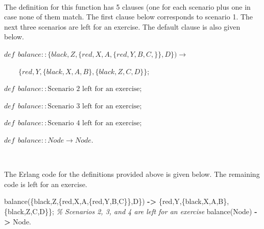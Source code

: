 \documentclass[
]{book}
\newenvironment{Shaded}{\begin{snugshade}}{\end{snugshade}}
\newcommand{\CharTok}[1]{\textcolor[rgb]{0.31,0.60,0.02}{#1}}
\newcommand{\CommentTok}[1]{\textcolor[rgb]{0.56,0.35,0.01}{\textit{#1}}}
\newcommand{\FunctionTok}[1]{\textcolor[rgb]{0.00,0.00,0.00}{#1}}
\newcommand{\OperatorTok}[1]{\textcolor[rgb]{0.81,0.36,0.00}{\textbf{#1}}}
\newcommand{\VariableTok}[1]{\textcolor[rgb]{0.00,0.00,0.00}{#1}}
\begin{document}
\(\nonumber\)

The definition for this function has 5 clauses (one for each scenario plus one in case none of them match. The first clause below corresponds to scenario 1. The next three scenarios are left for an exercise. The default clause is also given below.

\begin{formulabox}
\(\mathit{def} ~ ~ balance :: \lbrace black, Z, \lbrace red, X, A, \lbrace red, Y, B, C, \rbrace \rbrace, D \rbrace) \rightarrow\)

\(\quad \quad \lbrace red, Y, \lbrace black, X, A, B \rbrace, \lbrace black, Z, C, D \rbrace \rbrace;\)

\(\mathit{def} ~ ~ balance :: \text{Scenario 2 left for an exercise};\)

\(\mathit{def} ~ ~ balance :: \text{Scenario 3 left for an exercise};\)

\(\mathit{def} ~ ~ balance :: \text{Scenario 4 left for an exercise};\)

\(\mathit{def} ~ ~ balance :: Node \rightarrow Node.\)

\end{formulabox}

\(\nonumber\)

The Erlang code for the definitions provided above is given below. The remaining code is left for an exercise.

\begin{Shaded}
\begin{Highlighting}[]
\FunctionTok{balance(\{}\CharTok{black}\FunctionTok{,}\VariableTok{Z}\FunctionTok{,\{}\CharTok{red}\FunctionTok{,}\VariableTok{X}\FunctionTok{,}\VariableTok{A}\FunctionTok{,\{}\CharTok{red}\FunctionTok{,}\VariableTok{Y}\FunctionTok{,}\VariableTok{B}\FunctionTok{,}\VariableTok{C}\FunctionTok{\}\},}\VariableTok{D}\FunctionTok{\})} \OperatorTok{{-}\textgreater{}} \FunctionTok{\{}\CharTok{red}\FunctionTok{,}\VariableTok{Y}\FunctionTok{,\{}\CharTok{black}\FunctionTok{,}\VariableTok{X}\FunctionTok{,}\VariableTok{A}\FunctionTok{,}\VariableTok{B}\FunctionTok{\},\{}\CharTok{black}\FunctionTok{,}\VariableTok{Z}\FunctionTok{,}\VariableTok{C}\FunctionTok{,}\VariableTok{D}\FunctionTok{\}\};}
\CommentTok{\% Scenarios 2, 3, and 4 are left for an exercise}
\FunctionTok{balance(}\VariableTok{Node}\FunctionTok{)} \OperatorTok{{-}\textgreater{}} \VariableTok{Node}\FunctionTok{.}
\end{Highlighting}
\end{Shaded}
\end{document}
